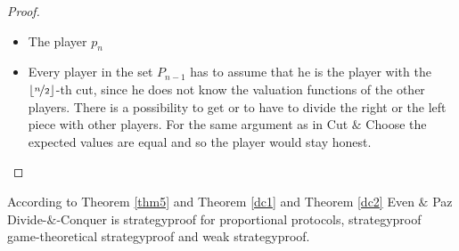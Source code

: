 \begin{proof}
\begin{itemize}
\item The player $p_n$\\
\item Every player in the set $P_{n-1}$ has to assume that he is the player with the $\lfloor\nicefrac{n}{2}\rfloor$-th cut, since he does not know the valuation functions of the other players. There is a possibility to get or to have to divide the right or the left piece with other players. For the same argument as in Cut $\&$ Choose the expected values are equal and so the player would stay honest.
\end{itemize}
\end{proof}

\begin{bezeichnungen}
According to Theorem \ref{thm5} and Theorem \ref{dc1} and Theorem \ref{dc2} 
Even $\&$ Paz Divide-$\&$-Conquer is strategyproof for proportional protocols, strategyproof game-theoretical strategyproof and weak strategyproof.
\end{bezeichnungen}
\newpage

